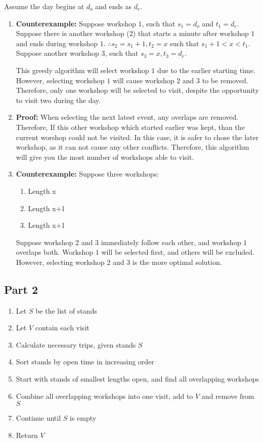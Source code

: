 \documentclass{article}
\begin{document}
Assume the day begins at $d_o$ and ends as $d_e$.

\begin{enumerate}[label=(\alph*)]
    \item \textbf{Counterexample:} Suppose workshop $1$, such that $s_1 = d_o$
    and $t_1 = d_e$. Suppose there is another workshop ($2$) that starts a minute
    after workshop $1$ and ends during workshop $1$. $\therefore s_2=s_1 + 1, t_2=x$
    such that $s_1+1 < x < t_1$. Suppose another workshop $3$, such that 
    $s_3 = x, t_3 = d_e$.

    This greedy algorithm will select workshop $1$ due to the earlier starting time.
    However, selecting workshop $1$ will cause workshop $2$ and $3$ to be removed.
    Therefore, only one workshop will be selected to visit,
    despite the opportunity to visit two during the day.

    \item \textbf{Proof:} When selecting the next latest event, any overlaps are removed.
    Therefore, If this other workshop which started earlier was kept, than the current
    worshop could not be visited. In this case, it is safer to chose the later workshop,
    as it can not cause any other conflicts. Therefore, this algorithm will give you the
    most number of workshops able to visit.

    \item \textbf{Counterexample:} Suppose three workshops:
        \begin{enumerate}[label=\arabic*]
            \item Length x
            \item Length x+1
            \item Length x+1
        \end{enumerate}

        Suppose workshop $2$ and $3$ immediately follow each other, and workshop $1$ overlaps both.
        Workshop $1$ will be selected first, and others will be excluded.
        However, selecting workshop $2$ and $3$ is the more optimal solution.
\end{enumerate}

\subsection{Part 2}

\begin{enumerate}
    \item Let $S$ be the list of stands
    \item Let $V$ contain each visit
    \item Calculate necessary trips, given stands $S$
    \item Sort stands by open time in increasing order
    \item Start with stands of smallest lengths open, and find all overlapping workshops
    \item Combine all overlapping workshops into one visit, add to $V$ and remove from $S$
    \item Continue until $S$ is empty
    \item Return $V$
\end{enumerate}
\end{document}
